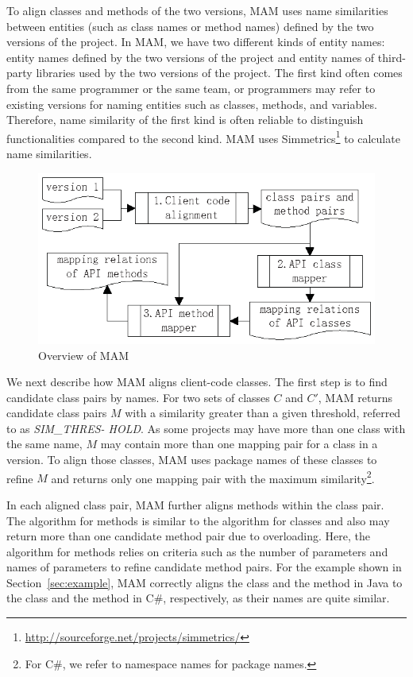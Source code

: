 To align classes and methods of the two versions, MAM uses
name similarities between entities (such as class names or method
names) defined by the two versions of the project. In MAM,
we have two different kinds of entity names: entity names defined by
the two versions of the project and entity names of third-party
libraries used by the two versions of the project. The first kind
often comes from the same programmer or the same team, or
programmers may refer to existing versions for naming entities such
as classes, methods, and variables. Therefore, name similarity of
the first kind is often reliable to distinguish functionalities
compared to the second kind. MAM uses
Simmetrics\footnote{\url{http://sourceforge.net/projects/simmetrics/}}
to calculate name similarities.
\begin{figure}[t]
\centering
\includegraphics[scale=1,clip]{figure/approach.eps}\vspace*{-3ex}
 \caption{Overview of MAM}\vspace*{-3.5ex}
 \label{fig:approach}
\end{figure}

We next describe how MAM aligns client-code classes.
The first step is to find candidate class pairs by names. For two sets
of classes $C$ and $C'$, MAM returns candidate class
pairs $M$ with a similarity greater than a given threshold,
referred to as \emph{SIM\_THRES- HOLD}. As some projects may have more
than one class with the same name, $M$ may contain more than one
mapping pair for a class in a version. To align those classes, MAM uses package names of these classes to refine $M$ and
returns only one mapping pair with the maximum
similarity\footnote{For C\#, we refer to namespace names for package
names.}.

In each aligned class pair, MAM further aligns methods
within the class pair. The algorithm for methods is similar to the
algorithm for classes and also may return more than one candidate
method pair due to overloading. Here, the algorithm for methods
relies on criteria such as the number of parameters and names of
parameters to refine candidate method pairs. For the example shown
in Section~\ref{sec:example}, MAM correctly aligns the
class  and the method  in Java to
the class  and the method  in C\#,
respectively, as their names are quite similar.
